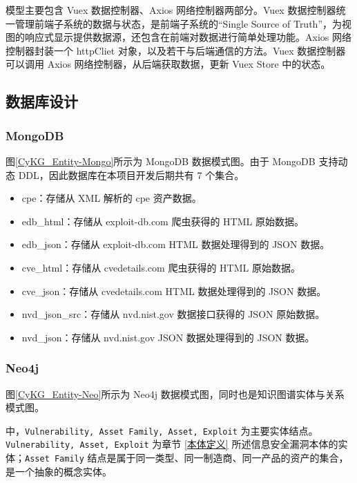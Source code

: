 \documentclass[a4paper,AutoFakeBold,oneside,12pt]{book}
\begin{document}
模型主要包含 Vuex 数据控制器、Axios 网络控制器两部分。Vuex 数据控制器统一管理前端子系统的数据与状态，是前端子系统的``Single Source of Truth''，为视图的响应式显示提供数据源，还包含在前端对数据进行简单处理功能。Axios 网络控制器封装一个 httpCliet 对象，以及若干与后端通信的方法。Vuex 数据控制器可以调用 Axios 网络控制器，从后端获取数据，更新 Vuex Store 中的状态。

\subsection{数据库设计}

\subsubsection{MongoDB}

图\ref{CyKG_Entity-Mongo}所示为 MongoDB 数据模式图。由于 MongoDB 支持动态 DDL，因此数据库在本项目开发后期共有 7 个集合。
\begin{itemize}
	\item cpe：存储从 XML 解析的 cpe 资产数据。
	\item edb{\_}html：存储从 exploit-db.com 爬虫获得的 HTML 原始数据。
	\item edb{\_}json：存储从 exploit-db.com HTML 数据处理得到的 JSON 数据。
	\item cve{\_}html：存储从 cvedetails.com 爬虫获得的 HTML 原始数据。
	\item cve{\_}json：存储从 cvedetails.com HTML 数据处理得到的 JSON 数据。
	\item nvd{\_}json{\_}src：存储从 nvd.nist.gov 数据接口获得的 JSON 原始数据。
	\item nvd{\_}json：存储从 nvd.nist.gov JSON 数据处理得到的 JSON 数据。
\end{itemize}


\subsubsection{Neo4j}

图\ref{CyKG_Entity-Neo}所示为 Neo4j 数据模式图，同时也是知识图谱实体与关系模式图。


中，\lstinline|Vulnerability, Asset Family, Asset, Exploit| 为主要实体结点。\lstinline|Vulnerability, Asset, Exploit| 为章节 \ref{本体定义} 所述信息安全漏洞本体的实体；\lstinline|Asset Family| 结点是属于同一类型、同一制造商、同一产品的资产的集合，是一个抽象的概念实体。
\end{document}
